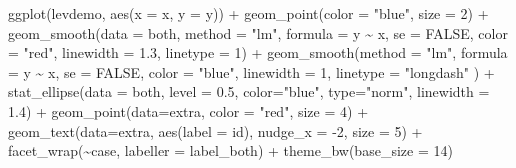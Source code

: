 \documentclass[
  letterpaper,
  10pt,
  krantz2]{krantz}
\makeatletter
\newenvironment{Shaded}{\begin{snugshade}}{\end{snugshade}}
\newcommand{\AttributeTok}[1]{\textcolor[rgb]{0.40,0.45,0.13}{#1}}
\newcommand{\ConstantTok}[1]{\textcolor[rgb]{0.56,0.35,0.01}{#1}}
\newcommand{\DecValTok}[1]{\textcolor[rgb]{0.68,0.00,0.00}{#1}}
\newcommand{\FloatTok}[1]{\textcolor[rgb]{0.68,0.00,0.00}{#1}}
\newcommand{\FunctionTok}[1]{\textcolor[rgb]{0.28,0.35,0.67}{#1}}
\newcommand{\NormalTok}[1]{\textcolor[rgb]{0.00,0.23,0.31}{#1}}
\newcommand{\SpecialCharTok}[1]{\textcolor[rgb]{0.37,0.37,0.37}{#1}}
\newcommand{\StringTok}[1]{\textcolor[rgb]{0.13,0.47,0.30}{#1}}
\newenvironment{kframe}{%
  \medskip{}
  \setlength{\fboxsep}{.8em}
  \def\at@end@of@kframe{}%
  \ifinner\ifhmode%
  \def\at@end@of@kframe{\end{minipage}}%
  \begin{minipage}{\columnwidth}%
  \fi\fi%
  \def\FrameCommand##1{\hskip\@totalleftmargin \hskip-\fboxsep
  \colorbox{shadecolor}{##1}\hskip-\fboxsep
      \hskip-\linewidth \hskip-\@totalleftmargin \hskip\columnwidth}%
  \MakeFramed {\advance\hsize-\width
    \@totalleftmargin\z@ \linewidth\hsize
    \@setminipage}}%
{\par\unskip\endMakeFramed%
  \at@end@of@kframe}
\renewenvironment{Shaded}{\begin{kframe}}{\end{kframe}}
\makeatother
\begin{document}
\begin{Shaded}
\begin{Highlighting}[]
\FunctionTok{ggplot}\NormalTok{(levdemo, }\FunctionTok{aes}\NormalTok{(}\AttributeTok{x =}\NormalTok{ x, }\AttributeTok{y =}\NormalTok{ y)) }\SpecialCharTok{+}
  \FunctionTok{geom\_point}\NormalTok{(}\AttributeTok{color =} \StringTok{"blue"}\NormalTok{, }\AttributeTok{size =} \DecValTok{2}\NormalTok{) }\SpecialCharTok{+}
  \FunctionTok{geom\_smooth}\NormalTok{(}\AttributeTok{data =}\NormalTok{ both, }
              \AttributeTok{method =} \StringTok{"lm"}\NormalTok{, }\AttributeTok{formula =}\NormalTok{ y }\SpecialCharTok{\textasciitilde{}}\NormalTok{ x, }\AttributeTok{se =} \ConstantTok{FALSE}\NormalTok{,}
              \AttributeTok{color =} \StringTok{"red"}\NormalTok{, }\AttributeTok{linewidth =} \FloatTok{1.3}\NormalTok{, }\AttributeTok{linetype =} \DecValTok{1}\NormalTok{) }\SpecialCharTok{+}
  \FunctionTok{geom\_smooth}\NormalTok{(}\AttributeTok{method =} \StringTok{"lm"}\NormalTok{, }\AttributeTok{formula =}\NormalTok{ y }\SpecialCharTok{\textasciitilde{}}\NormalTok{ x, }\AttributeTok{se =} \ConstantTok{FALSE}\NormalTok{,}
              \AttributeTok{color =} \StringTok{"blue"}\NormalTok{, }\AttributeTok{linewidth =} \DecValTok{1}\NormalTok{, }\AttributeTok{linetype =} \StringTok{"longdash"}\NormalTok{ ) }\SpecialCharTok{+}
  \FunctionTok{stat\_ellipse}\NormalTok{(}\AttributeTok{data =}\NormalTok{ both, }\AttributeTok{level =} \FloatTok{0.5}\NormalTok{, }\AttributeTok{color=}\StringTok{"blue"}\NormalTok{, }\AttributeTok{type=}\StringTok{"norm"}\NormalTok{, }\AttributeTok{linewidth =} \FloatTok{1.4}\NormalTok{) }\SpecialCharTok{+}
  \FunctionTok{geom\_point}\NormalTok{(}\AttributeTok{data=}\NormalTok{extra, }\AttributeTok{color =} \StringTok{"red"}\NormalTok{, }\AttributeTok{size =} \DecValTok{4}\NormalTok{) }\SpecialCharTok{+}
  \FunctionTok{geom\_text}\NormalTok{(}\AttributeTok{data=}\NormalTok{extra, }\FunctionTok{aes}\NormalTok{(}\AttributeTok{label =}\NormalTok{ id), }\AttributeTok{nudge\_x =} \SpecialCharTok{{-}}\DecValTok{2}\NormalTok{, }\AttributeTok{size =} \DecValTok{5}\NormalTok{) }\SpecialCharTok{+}
  \FunctionTok{facet\_wrap}\NormalTok{(}\SpecialCharTok{\textasciitilde{}}\NormalTok{case, }\AttributeTok{labeller =}\NormalTok{ label\_both) }\SpecialCharTok{+}
  \FunctionTok{theme\_bw}\NormalTok{(}\AttributeTok{base\_size =} \DecValTok{14}\NormalTok{)}
\end{Highlighting}
\end{Shaded}
\end{document}
